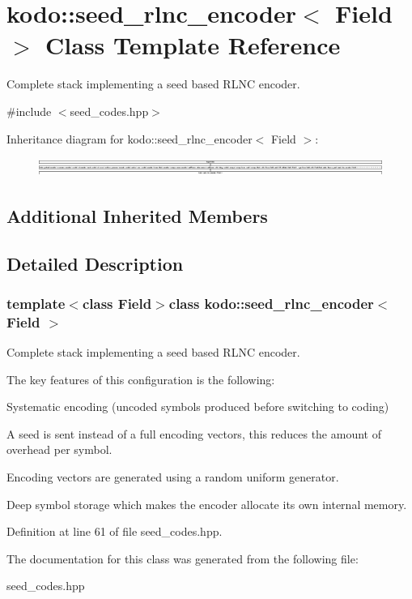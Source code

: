 \hypertarget{classkodo_1_1seed__rlnc__encoder}{\section{kodo\-:\-:seed\-\_\-rlnc\-\_\-encoder$<$ Field $>$ Class Template Reference}
\label{classkodo_1_1seed__rlnc__encoder}
}


Complete stack implementing a seed based R\-L\-N\-C encoder.  




{\ttfamily \#include $<$seed\-\_\-codes.\-hpp$>$}

Inheritance diagram for kodo\-:\-:seed\-\_\-rlnc\-\_\-encoder$<$ Field $>$\-:\begin{figure}[H]
\begin{center}
\leavevmode
\includegraphics[height=0.599358cm]{classkodo_1_1seed__rlnc__encoder}
\end{center}
\end{figure}
\subsection*{Additional Inherited Members}


\subsection{Detailed Description}
\subsubsection*{template$<$class Field$>$class kodo\-::seed\-\_\-rlnc\-\_\-encoder$<$ Field $>$}

Complete stack implementing a seed based R\-L\-N\-C encoder. 

The key features of this configuration is the following\-:
\begin{DoxyItemize}
\item Systematic encoding (uncoded symbols produced before switching to coding)
\item A seed is sent instead of a full encoding vectors, this reduces the amount of overhead per symbol.
\item Encoding vectors are generated using a random uniform generator.
\item Deep symbol storage which makes the encoder allocate its own internal memory. 
\end{DoxyItemize}

Definition at line 61 of file seed\-\_\-codes.\-hpp.



The documentation for this class was generated from the following file\-:\begin{DoxyCompactItemize}
\item 
seed\-\_\-codes.\-hpp\end{DoxyCompactItemize}
